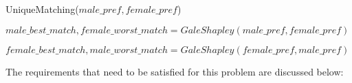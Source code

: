 \documentclass[11pt]{article}
\begin{document}
\begin{enumerate}
\begin{enumerate}
    \begin{algorithm}[H]
      \caption{UniqueMatching($male\_pref, female\_pref$)} 

      $male\_best\_match, female\_worst\_match = GaleShapley\left( male\_pref, female\_pref \right) $

      $female\_best\_match, male\_worst\_match = GaleShapley\left(female\_pref , male\_pref \right) $


    \end{algorithm}

    The requirements that need to be satisfied for this problem are discussed below:


\end{enumerate}
\end{enumerate}
\end{document}
